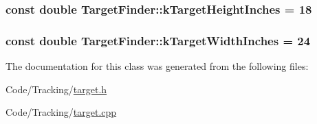 \hypertarget{class_target_finder_a023ae61af8bc95bab208897f7a035feb}{
\subsubsection[{k\-Target\-Height\-Inches}]{\setlength{\rightskip}{0pt plus 5cm}const double {\bf \-Target\-Finder\-::k\-Target\-Height\-Inches} = 18}}\label{class_target_finder_a023ae61af8bc95bab208897f7a035feb}
\hypertarget{class_target_finder_adc3ffcb09c3ccede2d80a9a660022323}{
\subsubsection[{k\-Target\-Width\-Inches}]{\setlength{\rightskip}{0pt plus 5cm}const double {\bf \-Target\-Finder\-::k\-Target\-Width\-Inches} = 24}}\label{class_target_finder_adc3ffcb09c3ccede2d80a9a660022323}


\-The documentation for this class was generated from the following files\-:\begin{DoxyCompactItemize}
\item 
\-Code/\-Tracking/\hyperlink{target_8h}{target.\-h}\item 
\-Code/\-Tracking/\hyperlink{target_8cpp}{target.\-cpp}\end{DoxyCompactItemize}
